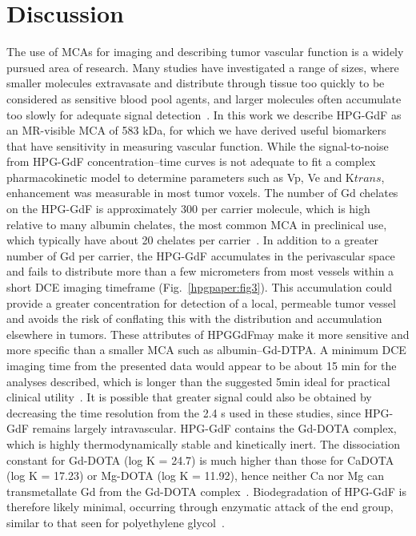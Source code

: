\section{Discussion}

The use of MCAs for imaging and describing tumor vascular function is a widely pursued area of research.
Many studies have investigated a range of sizes, where smaller molecules extravasate and distribute through tissue too quickly to be considered as sensitive blood pool agents, and larger molecules often accumulate too slowly for adequate signal detection~\cite{Kyle:2007ch,Tang:2013fi,Sourbron:2011ce}.
In this work we describe HPG-GdF as an MR-visible MCA of 583 kDa, for which we have derived useful biomarkers that have sensitivity in measuring vascular function.
While the signal-to-noise from HPG-GdF concentration–time curves is not adequate to fit a complex pharmacokinetic model to determine parameters such as Vp, Ve and K${trans}$, enhancement was measurable in most tumor voxels.
The number of Gd chelates on the HPG-GdF is approximately 300 per carrier molecule, which is high relative to many albumin chelates, the most common MCA in preclinical use, which typically have about 20 chelates per carrier~\cite{Ogan:1987tg}.
In addition to a greater number of Gd per carrier, the HPG-GdF accumulates in the perivascular space and fails to distribute more than a few micrometers from most vessels within a short DCE imaging timeframe (Fig.~\ref{hpgpaper:fig3}).
This accumulation could provide a greater concentration for detection of a local, permeable tumor vessel and avoids the risk of conflating this with the distribution and accumulation elsewhere in tumors.
These attributes of HPGGdFmay make it more sensitive and more specific than a smaller MCA such as albumin–Gd-DTPA.
A minimum DCE imaging time from the presented data would appear to be about 15 min for the analyses described, which is longer than the suggested 5min ideal for practical clinical utility~\cite{Turetschek:2004bw}.
It is possible that greater signal could also be obtained by decreasing the time resolution from the 2.4 s used in these studies, since HPG-GdF remains largely intravascular.
HPG-GdF contains the Gd-DOTA complex, which is highly thermodynamically stable and kinetically inert.
The dissociation constant for Gd-DOTA (log K = 24.7) is much higher than those for CaDOTA (log K = 17.23) or Mg-DOTA (log K = 11.92), hence neither Ca nor Mg can transmetallate Gd from the Gd-DOTA complex~\cite{Baranyai:2005ta}.
Biodegradation of HPG-GdF is therefore likely minimal, occurring through enzymatic attack of the end group, similar to that seen for polyethylene glycol~\cite{Kawai:2002fc}.
